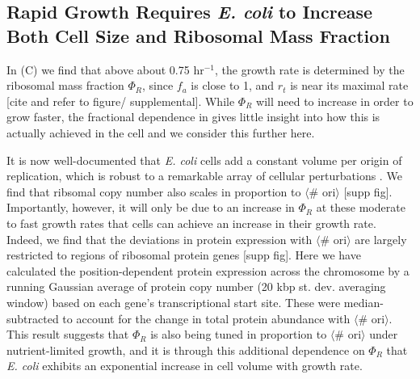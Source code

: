 \subsection{Rapid Growth Requires \textit{E. coli} to Increase Both Cell Size and Ribosomal
Mass Fraction}
In (C) we find that above about 0.75 hr$^{-1}$, the growth
rate is determined by the ribosomal mass fraction $\Phi_R$, since $f_a$ is close
to 1, and $r_t$ is near its maximal rate [cite and refer to figure/
supplemental]. While $\Phi_R$ will need to increase in order to grow faster, the
fractional dependence in  gives little insight
into how this is actually achieved in the cell and we consider this further here.

It is now well-documented that \textit{E. coli} cells add a constant volume per
origin of replication, which is robust to a remarkable array of cellular
perturbations \citep{si2017}. We find that ribsomal copy number also scales in
proportion to $\langle$\# ori$\rangle$ [supp fig]. Importantly, however, it will
only be due to an increase in $\Phi_R$ at these moderate to fast growth rates
that cells can achieve an increase in their growth rate. Indeed, we find that
the deviations in protein expression with $\langle$\# ori$\rangle$ are largely
restricted to regions of ribosomal protein genes [supp fig]. Here we have calculated
the position-dependent protein expression across the chromosome by a running
Gaussian average of protein copy number (20 kbp st. dev. averaging window) based
on each gene's transcriptional start site. These were median-subtracted to
account for the change in total protein abundance with $\langle$\# ori$\rangle$.
This result suggests that $\Phi_R$ is also being tuned in proportion to $\langle$\#
ori$\rangle$ under nutrient-limited growth, and it is through this additional
dependence on $\Phi_R$ that \textit{E. coli} exhibits an exponential increase in
cell volume with growth rate.




